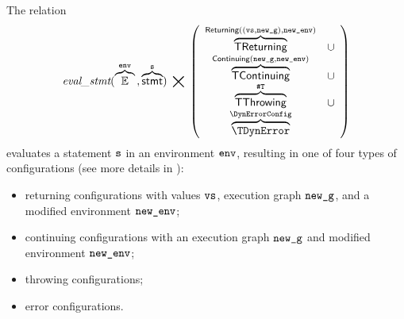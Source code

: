 The relation
\hypertarget{def-evalstmt}{}
\[
  \evalstmt{\overname{\envs}{\env} \aslsep \overname{\stmt}{\vs}} \;\aslrel\;
  \left(
  \begin{array}{cl}
  \overname{\TReturning}{\Returning((\vvs,\newg), \newenv)} & \cup\\
  \overname{\TContinuing}{\Continuing(\newg,\newenv)} & \cup\\
  \overname{\TThrowing}{\ThrowingConfig} & \cup \\
  \overname{\TDynError}{\DynErrorConfig} &
  \end{array}
  \right)
\]
evaluates a statement $\texttt{s}$ in an environment $\texttt{env}$, resulting in one of four types of configurations
(see more details in ):
\begin{itemize}
  \item returning configurations with values $\texttt{vs}$, execution graph $\texttt{new\_g}$, and a modified environment $\texttt{new\_env}$;
  \item continuing configurations with an execution graph $\texttt{new\_g}$ and modified environment $\texttt{new\_env}$;
  \item throwing configurations;
  \item error configurations.
\end{itemize}

